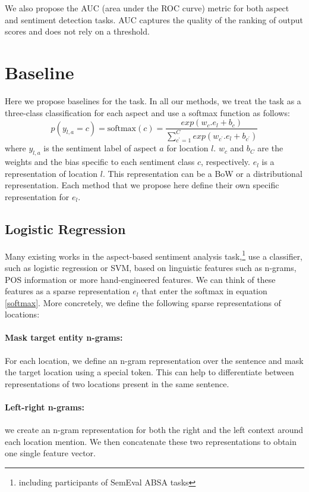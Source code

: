 \documentclass[11pt]{article}
\begin{document}
        We also propose the AUC (area under the ROC curve) metric for both aspect and sentiment detection tasks. AUC captures the quality of the ranking of output scores and does not rely on a threshold. 
    
\section{Baseline}
        Here we propose baselines for the task. In all our methods, we treat the task as a three-class classification for each aspect and use a softmax function as follows:
        \begin{equation}\label{softmax}
        p(y_{l,a} = c) = \mathrm{softmax} (c) = \frac{exp(w_c . e_l + b_c)}{\sum_{c^\prime=1}^C exp(w_{c^\prime} . e_l + b_{c^\prime})}
        \end{equation}
        where $y_{l,a}$ is the sentiment label of aspect $a$ for location $l$. $w_c$ and $b_C$ are the weights and the bias specific to each sentiment class $c$, respectively. $e_l$ is a representation of location $l$. This representation can be a BoW or a distributional representation. Each method that we propose here define their own specific representation for $e_l$. 
    \subsection{Logistic Regression}
        Many existing works in the aspect-based sentiment analysis task,\footnote{including participants of SemEval ABSA tasks} use a classifier, such as logistic regression or SVM, based on linguistic features such as n-grams, POS information or more hand-engineered features. We can think of these features as a sparse representation $e_l$ that enter the softmax in equation \ref{softmax}. More concretely, we define the following sparse representations of locations:
        \paragraph{Mask target entity n-grams:} For each location, we define an n-gram representation over the sentence and mask the target location using a special token. This can help to differentiate between representations of two locations present in the same sentence.
        \paragraph{Left-right n-grams:} we create an n-gram representation for both the right and the left context around each location mention. We then concatenate these two representations to obtain one single feature vector.
\end{document}
